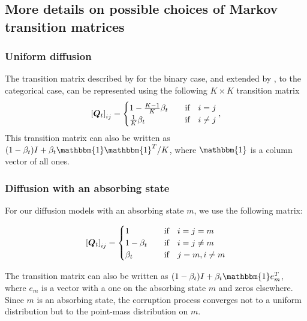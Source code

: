 \subsection{More details on possible choices of Markov transition matrices}
\label{sec:appendix_other_transition_mats}


\subsubsection{Uniform diffusion}
\label{sec:appendix_transition_uniform}

The transition matrix described by \citet{sohl2015deep} for the binary case, and extended by \citet{hoogeboom2021argmax}, to the categorical case, can be represented using the following $K\times K$ transition matrix
\begin{align}
    \left[\boldsymbol{Q}_t\right]_{ij} = \begin{cases}
    1 - \frac{K-1}{K} \beta_t \quad &\text{if}\quad i=j\\
    \frac{1}{K} \beta_t \quad &\text{if}\quad i\neq j
    \end{cases},
    \label{eq:cat_forward_kernel_mat_uniform}
\end{align} 
This transition matrix can also be written as $(1 - \beta_t) I + \beta_t \mathbbm{1} \mathbbm{1}^T / K$, where $\mathbbm{1}$ is a column vector of all ones.

\subsubsection{Diffusion with an absorbing state}
\label{sec:appendix_transition_mask}
For our diffusion models with an absorbing state $m$, we use the following matrix:

\begin{align}
    \left[\boldsymbol{Q}_t\right]_{ij} = \begin{cases}
    1  \quad&\text{if}  \quad i = j = m \\
    1 - \beta_t \quad &\text{if} \quad i = j \ne m \\
    \beta_t \quad &\text{if} \quad j = m, i \ne m\\
\end{cases}
    \label{eq:cat_forward_kernel_mat_mask}
\end{align}

The transition matrix can also be written as $(1 - \beta_t) I + \beta_t \mathbbm{1} e^T_m$, where $e_m$ is a vector with a one on the absorbing state $m$ and zeros elsewhere.
Since $m$ is an absorbing state, the corruption process converges not to a uniform distribution but to the point-mass distribution on $m$. 

